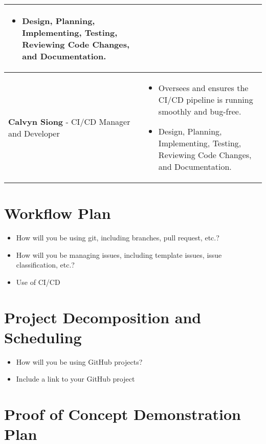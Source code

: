 \documentclass{article}
\begin{document}
\begin{center}
\begin{tabular}{ | m{4cm} | m{9cm} | }
\begin{itemize}
      \item Design, Planning, Implementing, Testing, Reviewing Code Changes, and Documentation.
    \end{itemize}\\ 
      \hline
        \textbf{Calvyn Siong} - CI/CD Manager and Developer & \begin{itemize}
      \item Oversees and ensures the CI/CD pipeline is running smoothly and bug-free.
      \item Design, Planning, Implementing, Testing, Reviewing Code Changes, and Documentation.
    \end{itemize}\\ 
      \hline

  \end{tabular}
\end{center}

\section{Workflow Plan}

\begin{itemize}
	\item How will you be using git, including branches, pull request, etc.?
	\item How will you be managing issues, including template issues, issue
	classification, etc.?
  \item Use of CI/CD
\end{itemize}

\section{Project Decomposition and Scheduling}

\begin{itemize}
  \item How will you be using GitHub projects?
  \item Include a link to your GitHub project
\end{itemize}


\section{Proof of Concept Demonstration Plan}
\end{document}
